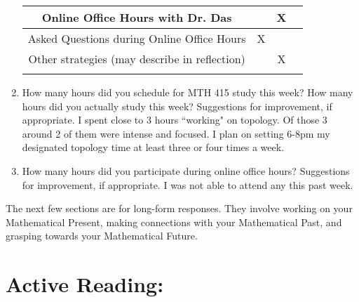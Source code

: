 \documentclass[11pt]{article}
\begin{document}
\begin{enumerate}
\begin{tabular}{|c|c|c|c|}
		Online Office Hours with Dr. Das &&X&\\
		\hline		
		Asked Questions during Online Office Hours &X&&\\
		\hline
		\hline
		
		Other strategies (may describe in reflection) &&X&\\
		&&&\\
		\hline
		
			
	\end{tabular}

\item How many hours did you schedule for MTH 415 study this week? How many hours did you actually study this week? Suggestions for improvement, if appropriate.
\vfill
I spent close to 3 hours ``working" on topology. Of those 3 around 2 of them were intense and focused. I plan on setting 6-8pm my designated topology time at least three or four times a week.
\item How many hours did you participate during online office hours? Suggestions for improvement, if appropriate.
\vfill
I was not able to attend any this past week.
\end{enumerate}

\newpage
The next few sections are for long-form responses. They involve working on your Mathematical Present, making connections with your Mathematical Past, and grasping towards your Mathematical Future.

\section*{Active Reading:}
\end{document}
